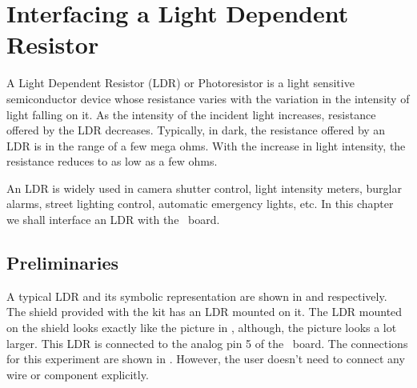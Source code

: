 \chapter {Interfacing a Light Dependent Resistor}
\thispagestyle{empty}
\label{ldr}

\newcommand{\LocLDRfig}{\Origin/user-code/ldr/figures}
\newcommand{\LocLDRscicode}{\Origin/user-code/ldr/scilab}
\newcommand{\LocLDRscibrief}[1]{{\tt
      \seqsplit{Origin/user-code/ldr/scilab/#1}},
  see \fnrefp{fn:file-loc}}
\newcommand{\LocLDRardcode}{\Origin/user-code/ldr/arduino}
\newcommand{\LocLDRardbrief}[1]{{\tt
      \seqsplit{Origin/user-code/ldr/arduino/#1}},
  see \fnrefp{fn:file-loc}}

\newcommand{\LocLDRpycode}{\Origin/user-code/ldr/python}
\newcommand{\LocLDRpybrief}[1]{{\tt \seqsplit{%
        Origin/user-code/ldr/python/#1}}, see \fnrefp{fn:file-loc}}

\newcommand{\LocLDRjuliacode}{\Origin/user-code/ldr/julia}
\newcommand{\LocLDRjuliabrief}[1]{{\tt \seqsplit{%
        Origin/user-code/ldr/julia/#1}}, see \fnrefp{fn:file-loc}}

\newcommand{\LocLDROpenModelicacode}{\Origin/user-code/ldr/OpenModelica}  %
\newcommand{\LocLDROpenModelicabrief}[1]{{\tt \seqsplit{%
        Origin/user-code/led/OpenModelica/#1}}, see \fnrefp{fn:file-loc}} %



A Light Dependent Resistor (LDR) or Photoresistor is a light sensitive
semiconductor device whose resistance varies with the variation in the
intensity of light falling on it. As the intensity of the incident
light increases, resistance offered by the LDR decreases. Typically,
in dark, the resistance offered by an LDR is in the range of a few
mega ohms. With the increase in light intensity, the resistance
reduces to as low as a few ohms.   

An LDR is widely used in camera shutter control, light intensity
meters, burglar alarms, street lighting control, automatic emergency
lights, etc. In this chapter we shall interface an LDR with the
\arduino\ board.  

\section{Preliminaries}
A typical LDR and its symbolic representation are shown in
 and  respectively. The shield
provided with the kit has an LDR mounted on it.  The LDR mounted on
the shield looks exactly like the picture in ,
although, the picture looks a lot larger.  This LDR is connected
to the analog pin 5 of the \arduino\ board. The connections for this
experiment are shown in . However, the user
doesn't need to connect any wire or component explicitly.

